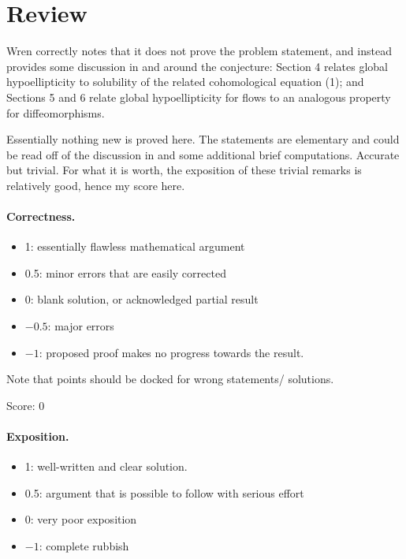 \documentclass[11pt]{article}
\theoremstyle{definition}
\theoremstyle{remark}
\begin{document}
\maketitle

\section{Review}
{\color{gray} 

Wren correctly notes that it does not prove the problem statement, and instead provides some discussion in and around the conjecture: Section 4 relates global hypoellipticity to solubility of the related cohomological equation (1); and Sections 5 and 6 relate global hypoellipticity for flows to an analogous property for diffeomorphisms. 

Essentially nothing new is proved here. The statements are elementary and could be read off of the discussion in \cite{Forni} and some additional brief computations. Accurate but trivial. For what it is worth, the exposition of these trivial remarks is relatively good, hence my score here. }

\paragraph{Correctness.}
\begin{itemize}
	\item  1: essentially flawless mathematical argument
	\item  0.5: minor errors that are easily corrected
	\item  0: blank solution, or acknowledged partial result
	\item  $-0.5$: major errors
	\item  $-1$: proposed proof makes no progress towards the result.
\end{itemize}
Note that points should be docked for wrong statements/ solutions.

\noindent Score: 0

\paragraph{Exposition.}
\begin{itemize}
	\item  1: well-written and clear solution.
	\item  0.5: argument that is possible to follow with serious effort
	\item  0: very poor exposition
	\item  $-1$: complete rubbish
\end{itemize}
\end{document}
